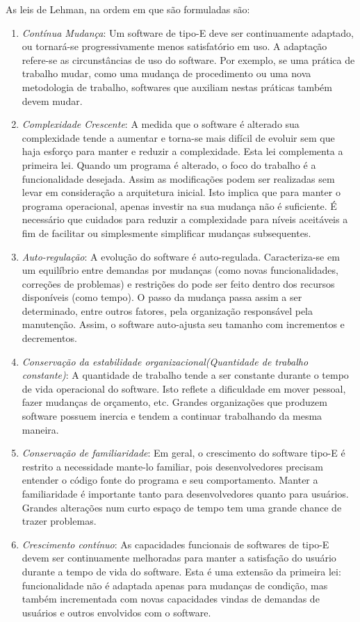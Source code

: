 As leis de Lehman, na ordem em que são formuladas são:
\begin{enumerate}
	\item \textit{Contínua Mudança}: Um software de tipo-E deve ser continuamente adaptado, ou tornará-se progressivamente menos satisfatório em uso. A adaptação refere-se as circunstâncias de uso do software. Por exemplo, se uma prática de trabalho mudar, como uma mudança de procedimento ou uma nova metodologia de trabalho, softwares que auxiliam nestas práticas também devem mudar.
	\item \textit{Complexidade Crescente}: A medida que o software é alterado sua complexidade tende a aumentar e torna-se mais difícil de evoluir sem que haja esforço para manter e reduzir a complexidade. Esta lei complementa a primeira lei. Quando um programa é alterado, o foco do trabalho é a funcionalidade desejada. Assim as modificações podem ser realizadas sem levar em consideração a arquitetura inicial. Isto implica que para manter o programa operacional, apenas investir na sua mudança não é suficiente. É necessário que cuidados para reduzir a complexidade para níveis aceitáveis a fim de facilitar ou simplesmente simplificar mudanças subsequentes.
	\item \textit{Auto-regulação}: A evolução do software é auto-regulada. Caracteriza-se em um equilíbrio entre demandas por mudanças (como novas funcionalidades, correções de problemas) e restrições do pode ser feito dentro dos recursos disponíveis (como tempo). O passo da mudança passa assim a ser determinado, entre outros fatores, pela organização responsável pela manutenção. Assim, o software auto-ajusta seu tamanho com incrementos e decrementos.
	\item \textit{Conservação da estabilidade organizacional(Quantidade de trabalho constante)}: A quantidade de trabalho tende a ser constante durante o tempo de vida operacional do software. Isto reflete a dificuldade em mover pessoal, fazer mudanças de orçamento, etc. Grandes organizações que produzem software possuem inercia e tendem a continuar trabalhando da mesma maneira. 
	\item \textit{Conservação de familiaridade}: Em geral, o crescimento do software tipo-E é restrito a necessidade mante-lo familiar, pois desenvolvedores precisam entender o código fonte do programa e seu comportamento. Manter a familiaridade é importante tanto para desenvolvedores quanto para usuários. Grandes alterações num curto espaço de tempo tem uma grande chance de trazer problemas.
	\item \textit{Crescimento contínuo}: As capacidades funcionais de softwares de tipo-E devem ser continuamente melhoradas para manter a satisfação do usuário durante a tempo de vida do software. Esta é uma extensão da primeira lei: funcionalidade não é adaptada apenas para mudanças de condição, mas também incrementada com novas capacidades vindas de demandas de usuários e outros envolvidos com o software.

\end{enumerate}
